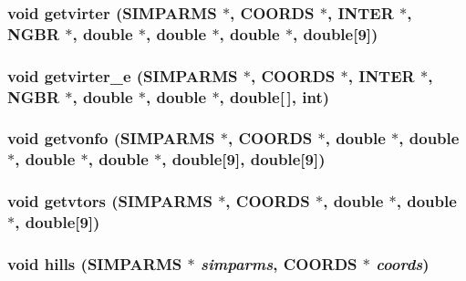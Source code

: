 \subsubsection{\setlength{\rightskip}{0pt plus 5cm}void getvirter ({\bf SIMPARMS} $\ast$, {\bf COORDS} $\ast$, {\bf INTER} $\ast$, {\bf NGBR} $\ast$, double $\ast$, double $\ast$, double $\ast$, double[9])}\label{test_2dzug_2proto__energy_8h_44102eb0048383959901566cbf801f0b}


\subsubsection{\setlength{\rightskip}{0pt plus 5cm}void getvirter\_\-e ({\bf SIMPARMS} $\ast$, {\bf COORDS} $\ast$, {\bf INTER} $\ast$, {\bf NGBR} $\ast$, double $\ast$, double $\ast$, double[$\,$], int)}\label{test_2dzug_2proto__energy_8h_c6dfdb12ae11d664073949b04e180d0e}


\subsubsection{\setlength{\rightskip}{0pt plus 5cm}void getvonfo ({\bf SIMPARMS} $\ast$, {\bf COORDS} $\ast$, double $\ast$, double $\ast$, double $\ast$, double $\ast$, double[9], double[9])}\label{test_2dzug_2proto__energy_8h_f62510e52bfa61ba8c007eb024e4cb38}


\subsubsection{\setlength{\rightskip}{0pt plus 5cm}void getvtors ({\bf SIMPARMS} $\ast$, {\bf COORDS} $\ast$, double $\ast$, double $\ast$, double[9])}\label{test_2dzug_2proto__energy_8h_88eeb742d73772d936ed57e2fa6fe753}


\subsubsection{\setlength{\rightskip}{0pt plus 5cm}void hills ({\bf SIMPARMS} $\ast$ {\em simparms}, {\bf COORDS} $\ast$ {\em coords})}\label{test_2dzug_2proto__energy_8h_31ba0db42c93656d34b74475d6fc2797}


